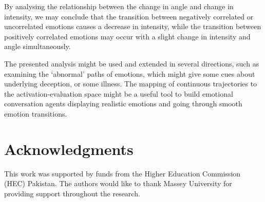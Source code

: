 \documentclass[10pt,journal,cspaper,compsoc]{IEEEtran}
\begin{document}
By analysing the relationship between the change in angle and change in intensity, we may conclude that the transition between negatively correlated or uncorrelated emotions causes a decrease in intensity, while the transition between positively correlated emotions may occur with a slight change in intensity and angle simultaneously. 

The presented analysis might be used and extended in several directions, such as examining the `abnormal' paths of emotions, which might give some cues about underlying deception, or some illness. The mapping of continuous trajectories to the activation-evaluation space might be a useful tool to build emotional conversation agents displaying realistic emotions and going through smooth emotion transitions.

\section*{Acknowledgments}
This work was supported by funds from the Higher Education Commission (HEC) Pakistan. The authors would like to thank Massey University for providing support throughout the research.


\ifCLASSOPTIONcaptionsoff
  \newpage
\fi




 
\end{document}
